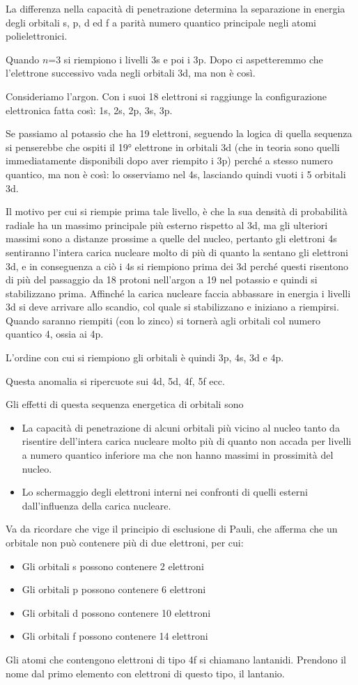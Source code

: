 La differenza nella capacità di penetrazione determina la separazione in energia degli orbitali s, p, d ed f a parità numero quantico principale negli atomi polielettronici.

Quando $n$=3 si riempiono i livelli 3s e poi i 3p. Dopo ci aspetteremmo che l'elettrone successivo vada negli orbitali 3d, ma non è così.

Consideriamo l'argon. Con i suoi 18 elettroni si raggiunge la configurazione elettronica fatta così: 1s, 2s, 2p, 3s, 3p.

Se passiamo al potassio che ha 19 elettroni, seguendo la logica di quella sequenza si penserebbe che ospiti il 19° elettrone in orbitali 3d (che in teoria sono quelli immediatamente disponibili dopo aver riempito i 3p) perché a stesso numero quantico, ma non è così: lo osserviamo nel 4s, lasciando quindi vuoti i 5 orbitali 3d.

Il motivo per cui si riempie prima tale livello, è che la sua densità di probabilità radiale ha un massimo principale più esterno rispetto al 3d, ma gli ulteriori massimi sono a distanze prossime a quelle del nucleo, pertanto gli elettroni 4s sentiranno l'intera carica nucleare molto di più di quanto la sentano gli elettroni 3d, e in conseguenza a ciò i 4s si riempiono prima dei 3d perché questi risentono di più del passaggio da 18 protoni nell'argon a 19 nel potassio e quindi si stabilizzano prima. Affinché la carica nucleare faccia abbassare in energia i livelli 3d si deve arrivare allo scandio, col quale si stabilizzano e iniziano a riempirsi. Quando saranno riempiti (con lo zinco) si tornerà agli orbitali col numero quantico 4, ossia ai 4p.

L'ordine con cui si riempiono gli orbitali è quindi 3p, 4s, 3d e 4p.

Questa anomalia si ripercuote sui 4d, 5d, 4f, 5f ecc.

Gli effetti di questa sequenza energetica di orbitali sono
\begin{itemize}
  \item La capacità di penetrazione di alcuni orbitali più vicino al nucleo tanto da risentire dell'intera carica nucleare molto più di quanto non accada per livelli a numero quantico inferiore ma che non hanno massimi in prossimità del nucleo.
  \item Lo schermaggio degli elettroni interni nei confronti di quelli esterni dall'influenza della carica nucleare.
\end{itemize}
Va da ricordare che vige il principio di esclusione di Pauli, che afferma che un orbitale non può contenere più di due elettroni, per cui:
\begin{itemize}
  \item Gli orbitali s possono contenere 2 elettroni
  \item Gli orbitali p possono contenere 6 elettroni
  \item Gli orbitali d possono contenere 10 elettroni
  \item Gli orbitali f possono contenere 14 elettroni
\end{itemize}
Gli atomi che contengono elettroni di tipo 4f si chiamano lantanidi. Prendono il nome dal primo elemento con elettroni di questo tipo, il lantanio.

